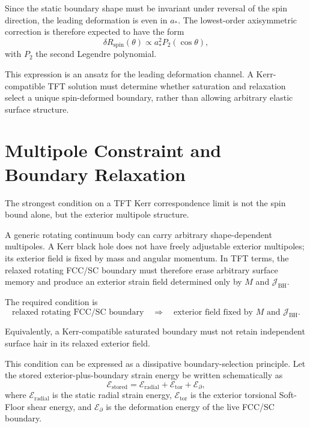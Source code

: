 Since the static boundary shape must be invariant under reversal of the spin direction, the leading deformation is even in $a_\ast$. The lowest-order axisymmetric correction is therefore expected to have the form
\begin{equation}
    \delta R_{\mathrm{spin}}(\theta) \propto a_\ast^2 P_2(\cos\theta),
\end{equation}
with $P_2$ the second Legendre polynomial.

This expression is an ansatz for the leading deformation channel. A Kerr-compatible TFT solution must determine whether saturation and relaxation select a unique spin-deformed boundary, rather than allowing arbitrary elastic surface structure.

\section{Multipole Constraint and Boundary Relaxation}

The strongest condition on a TFT Kerr correspondence limit is not the spin bound alone, but the exterior multipole structure.

A generic rotating continuum body can carry arbitrary shape-dependent multipoles. A Kerr black hole does not have freely adjustable exterior multipoles; its exterior field is fixed by mass and angular momentum. In TFT terms, the relaxed rotating FCC/SC boundary must therefore erase arbitrary surface memory and produce an exterior strain field determined only by \(M\) and \(\mathcal{J}_{\mathrm{BH}}\).

The required condition is
\begin{equation}
    \text{relaxed rotating FCC/SC boundary}
    \quad
    \Rightarrow
    \quad
    \text{exterior field fixed by } M \text{ and } \mathcal{J}_{\mathrm{BH}}.
\end{equation}

Equivalently, a Kerr-compatible saturated boundary must not retain independent surface hair in its relaxed exterior field.

This condition can be expressed as a dissipative boundary-selection principle. Let the stored exterior-plus-boundary strain energy be written schematically as
\begin{equation}
    \mathcal{E}_{\mathrm{stored}}
    =
    \mathcal{E}_{\mathrm{radial}}
    +
    \mathcal{E}_{\mathrm{tor}}
    +
    \mathcal{E}_{\partial},
\end{equation}
where \(\mathcal{E}_{\mathrm{radial}}\) is the static radial strain energy, \(\mathcal{E}_{\mathrm{tor}}\) is the exterior torsional Soft-Floor shear energy, and \(\mathcal{E}_{\partial}\) is the deformation energy of the live FCC/SC boundary.

